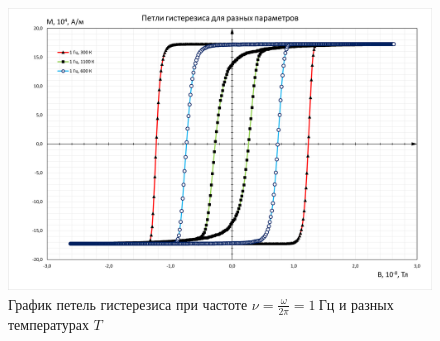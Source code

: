 \documentclass[oneside,final,14pt]{extarticle}
\begin{document}
\begin{figure}[h]
\centering
\includegraphics[scale=0.6]{fig1orig.png}
\caption{График петель гистерезиса при частоте $\nu=\frac{\omega}{2\pi}=1 \ \text{Гц}$ и разных температурах $T$}
\label{ris:hyst1}
\end{figure}
\end{document}
